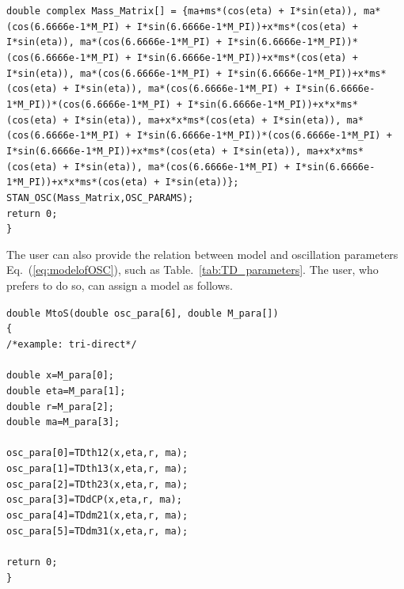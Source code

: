 \documentclass[aps,prd,nofootinbib,preprint]{revtex4}
\begin{document}
    \texttt{double complex Mass\_Matrix[] = \{ma+ms*(cos(eta) + I*sin(eta)), ma*(cos(6.6666e-1*M\_PI) + I*sin(6.6666e-1*M\_PI))+x*ms*(cos(eta) + I*sin(eta)), ma*(cos(6.6666e-1*M\_PI) + I*sin(6.6666e-1*M\_PI))*(cos(6.6666e-1*M\_PI) + I*sin(6.6666e-1*M\_PI))+x*ms*(cos(eta) + I*sin(eta)), ma*(cos(6.6666e-1*M\_PI) + I*sin(6.6666e-1*M\_PI))+x*ms*(cos(eta) + I*sin(eta)), ma*(cos(6.6666e-1*M\_PI) + I*sin(6.6666e-1*M\_PI))*(cos(6.6666e-1*M\_PI) + I*sin(6.6666e-1*M\_PI))+x*x*ms*(cos(eta) + I*sin(eta)), ma+x*x*ms*(cos(eta) + I*sin(eta)), ma*(cos(6.6666e-1*M\_PI) + I*sin(6.6666e-1*M\_PI))*(cos(6.6666e-1*M\_PI) + I*sin(6.6666e-1*M\_PI))+x*ms*(cos(eta) + I*sin(eta)), ma+x*x*ms*(cos(eta) + I*sin(eta)), ma*(cos(6.6666e-1*M\_PI) + I*sin(6.6666e-1*M\_PI))+x*x*ms*(cos(eta) + I*sin(eta))\};}\\
    
    \texttt{STAN\_OSC(Mass\_Matrix,OSC\_PARAMS);}\\
    
    \texttt{return 0;}\\
\texttt{\} }

The user can also provide the relation between model and oscillation parameters Eq.~(\ref{eq:modelofOSC}), such as Table.~\ref{tab:TD_parameters}. The user, who prefers to do so, can assign a model as follows.

\texttt{double MtoS(double osc\_para[6], double M\_para[])}\\
\texttt{\{}\\
    \texttt{/*example: tri-direct*/}\\
\\    
    \texttt{double x=M\_para[0];}\\
    \texttt{double eta=M\_para[1];}\\
    \texttt{double r=M\_para[2];}\\
    \texttt{double ma=M\_para[3];}\\
\\  
    \texttt{osc\_para[0]=TDth12(x,eta,r, ma);}\\
    \texttt{osc\_para[1]=TDth13(x,eta,r, ma);}\\
    \texttt{osc\_para[2]=TDth23(x,eta,r, ma);}\\
    \texttt{osc\_para[3]=TDdCP(x,eta,r, ma);}\\
    \texttt{osc\_para[4]=TDdm21(x,eta,r, ma);}\\
    \texttt{osc\_para[5]=TDdm31(x,eta,r, ma);}\\
\\    
    \texttt{return 0;}\\
\texttt{\}}\\
\end{document}
